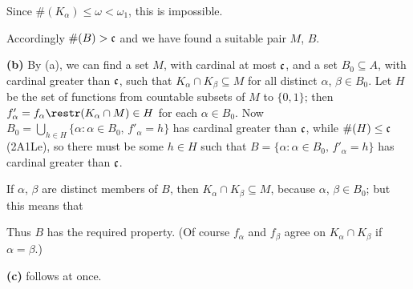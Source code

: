 { 
      
\noindent Since $\#(K_{\alpha})\le\omega<\omega_1$, this is 
impossible.\ \Bang 
      
Accordingly $\#(B)>\frak c$ and we have found a suitable pair $M$, $B$. 
      
\medskip 
      
{\bf (b)} By (a), we can find a set $M$, with cardinal at most $\frak c$, 
and a set $B_0\subseteq A$, with cardinal greater than $\frak c$, such that $K_{\alpha}\cap K_{\beta}\subseteq M$ for all distinct $\alpha$, 
$\beta\in B_0$.   Let $H$ be the set of functions from countable subsets of $M$ to $\{0,1\}$;  then 
$f'_{\alpha}=f_{\alpha}\restr(K_{\alpha}\cap M)\in H$ for 
each $\alpha\in B_0$.   Now 
$B_0=\bigcup_{h\in H}\{\alpha:\alpha\in B_0,\,f'_{\alpha}=h\}$ has cardinal greater than $\frak c$, while 
$\#(H)\le\frak c$ (2A1Le), so there must be some $h\in H$ such that 
$B=\{\alpha:\alpha\in B_0,\,f'_{\alpha}=h\}$ has cardinal greater than 
$\frak c$. 
      
If $\alpha$, $\beta$ are distinct members of $B$, then 
$K_{\alpha}\cap K_{\beta}\subseteq M$, because $\alpha$, $\beta\in B_0$;  but this means that 
      
      
\noindent Thus $B$ has the required property.   (Of course $f_{\alpha}$ 
and $f_{\beta}$ agree on $K_{\alpha}\cap K_{\beta}$ if $\alpha=\beta$.) 
      
\medskip 
      
{\bf (c)} follows at once. 
}%
      
      
\discrpage 
      

